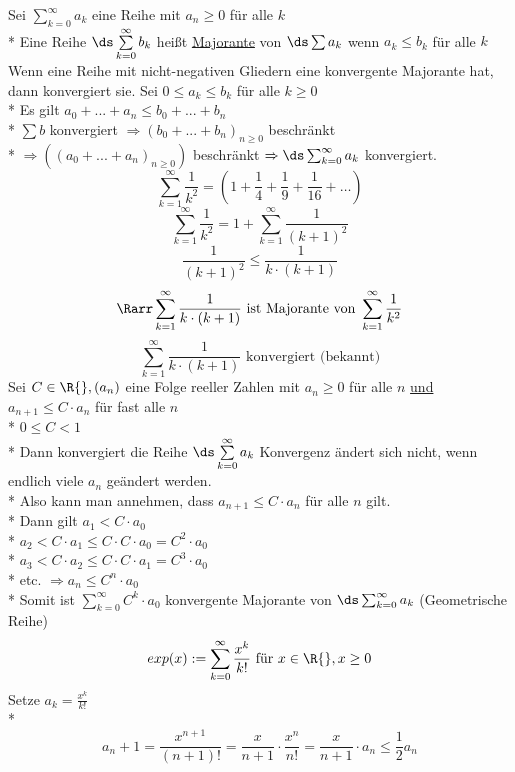 Sei $\displaystyle\sum\limits_{k=0}^{\infty} a_k$ eine Reihe mit $a_n \geq 0$ für alle $k$\\*
Eine Reihe $\ds\sum\limits_{k=0}^{\infty} b_k$ heißt \ul{Majorante} von $\ds\sum a_k$ wenn $a_k \leq b_k$ für alle $k$
Wenn eine Reihe mit nicht-negativen Gliedern eine konvergente Majorante hat, dann konvergiert sie.
\bew
Sei $0 \leq a_k \leq b_k$ für alle $k \geq 0$\\*
Es gilt $a_0 + ... + a_n \leq b_0 + ... + b_n$ \\*
$\sum b$ konvergiert $\Rightarrow (b_0 + ... + b_n)_{n \geq 0}$  beschränkt\\*
$\Rightarrow ((a_0 + ... + a_n)_{n \geq 0})$ beschränkt $\Rightarrow \ds\sum_{k= 0}^{\infty} a_k$ konvergiert.
$$\sum\limits_{k=1}^{\infty} \frac{1}{k^2} = \left( 1 + \frac{1}{4} + \frac{1}{9}+ \frac{1}{16} + … \right)$$
$$\sum\limits_{k=1}^{\infty} \frac{1}{k^2} = 1 + \sum\limits_{k=1}^{\infty} \frac{1}{(k + 1)^2}$$
$$\frac{1}{(k + 1)^2} \leq \frac{1}{k \cdot (k + 1)}$$
$$\Rarr \sum\limits_{k=1}^{\infty} \frac{1}{k \cdot (k + 1)}\text{ ist Majorante von }\sum\limits_{k=1}^{\infty} \frac{1}{k^2}$$
$$\sum\limits_{k=1}^{\infty} \frac{1}{k \cdot (k + 1)}\text{ konvergiert (bekannt)}$$
Sei $C \in \R{}, (a_n)$ eine Folge reeller Zahlen mit $a_n \geq 0$ für alle $n$ \ul{und} $a_{n + 1} \leq C \cdot a_n$ für fast alle $n$\\*
$0 \leq C < 1$\\*
Dann konvergiert die Reihe $\ds\sum\limits_{k=0}^{\infty} a_k$
\bew
Konvergenz ändert sich nicht, wenn endlich viele $a_n$ geändert werden.\\*
Also kann man annehmen, dass $a_{n + 1} \leq C \cdot a_n$ für alle $n$ gilt.\\*
Dann gilt $a_1 < C \cdot a_0$\\*
$a_2 < C \cdot a_1 \leq C \cdot C \cdot a_0 = C^2 \cdot a_0$\\*
$a_3 < C \cdot a_2 \leq C \cdot C \cdot a_1 = C^3 \cdot a_0$\\*
etc. $\Rightarrow a_n \leq C^n \cdot a_0$\\*
Somit ist $\displaystyle\sum\limits_{k=0}^{\infty} C^k \cdot a_0$ konvergente Majorante von $\ds\sum_{k=0}^{\infty} a_k$ (Geometrische Reihe)
$$exp(x) := \sum\limits_{k=0}^{\infty} \frac{x^k}{k!} \text{ für } x \in \R{}, x \geq 0$$
Setze $a_k = \frac{x^k}{k!}$\\*
$$a_n+1 = \frac{x^{n + 1}}{(n + 1)!} = \frac{x}{n+1} \cdot \frac{x^n}{n!} = \frac{x}{n+1} \cdot a_n \leq \frac{1}{2} a_n$$
